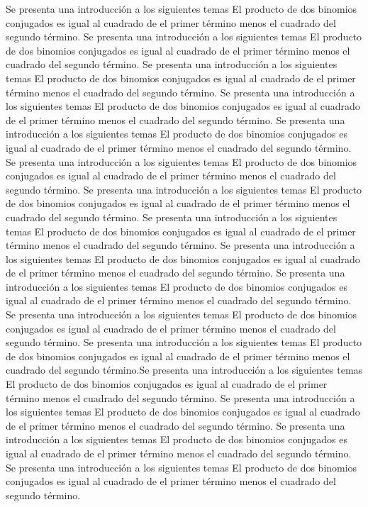 \documentclass[journal]{IEEEtran}
\begin{document}
Se presenta una introducción a los siguientes temas El producto de dos binomios conjugados es igual al cuadrado de el primer término menos el cuadrado del segundo término.
Se presenta una introducción a los siguientes temas El producto de dos binomios conjugados es igual al cuadrado de el primer término menos el cuadrado del segundo término.
Se presenta una introducción a los siguientes temas El producto de dos binomios conjugados es igual al cuadrado de el primer término menos el cuadrado del segundo término.
Se presenta una introducción a los siguientes temas El producto de dos binomios conjugados es igual al cuadrado de el primer término menos el cuadrado del segundo término.
Se presenta una introducción a los siguientes temas El producto de dos binomios conjugados es igual al cuadrado de el primer término menos el cuadrado del segundo término.
Se presenta una introducción a los siguientes temas El producto de dos binomios conjugados es igual al cuadrado de el primer término menos el cuadrado del segundo término.
Se presenta una introducción a los siguientes temas El producto de dos binomios conjugados es igual al cuadrado de el primer término menos el cuadrado del segundo término.
Se presenta una introducción a los siguientes temas El producto de dos binomios conjugados es igual al cuadrado de el primer término menos el cuadrado del segundo término.
Se presenta una introducción a los siguientes temas El producto de dos binomios conjugados es igual al cuadrado de el primer término menos el cuadrado del segundo término.
Se presenta una introducción a los siguientes temas El producto de dos binomios conjugados es igual al cuadrado de el primer término menos el cuadrado del segundo término.\\
Se presenta una introducción a los siguientes temas El producto de dos binomios conjugados es igual al cuadrado de el primer término menos el cuadrado del segundo término.
Se presenta una introducción a los siguientes temas El producto de dos binomios conjugados es igual al cuadrado de el primer término menos el cuadrado del segundo término.Se presenta una introducción a los siguientes temas El producto de dos binomios conjugados es igual al cuadrado de el primer término menos el cuadrado del segundo término.
Se presenta una introducción a los siguientes temas El producto de dos binomios conjugados es igual al cuadrado de el primer término menos el cuadrado del segundo término.
Se presenta una introducción a los siguientes temas El producto de dos binomios conjugados es igual al cuadrado de el primer término menos el cuadrado del segundo término.
Se presenta una introducción a los siguientes temas El producto de dos binomios conjugados es igual al cuadrado de el primer término menos el cuadrado del segundo término.\cite{ref2}
\end{document}
